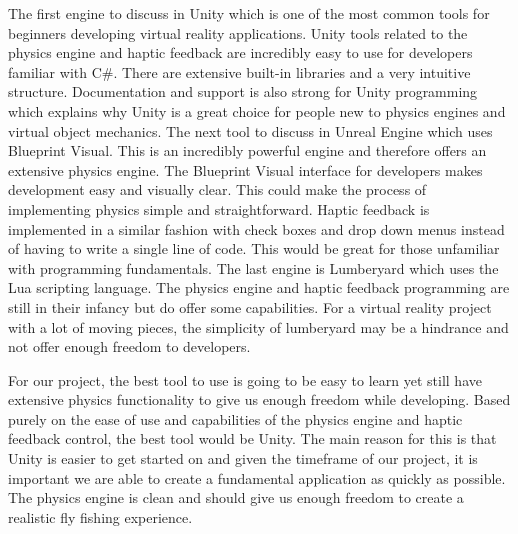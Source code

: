 \documentclass[10pt,journal,compsoc,onecolumn, draftclsnofoot]{IEEEtran}
\begin{document}
The first engine to discuss in Unity which is one of the most common tools for beginners developing virtual reality applications. Unity tools related to the physics engine and haptic feedback are incredibly easy to use for developers familiar with C\#. There are extensive built-in libraries and a very intuitive structure. Documentation and support is also strong for Unity programming which explains why Unity is a great choice for people new to physics engines and virtual object mechanics. The next tool to discuss in Unreal Engine which uses Blueprint Visual. This is an incredibly powerful engine and therefore offers an extensive physics engine. The Blueprint Visual interface for developers makes development easy and visually clear. This could make the process of implementing physics simple and straightforward. Haptic feedback is implemented in a similar fashion with check boxes and drop down menus instead of having to write a single line of code. This would be great for those unfamiliar with programming fundamentals. The last engine is Lumberyard which uses the Lua scripting language. The physics engine and haptic feedback programming are still in their infancy but do offer some capabilities. For a virtual reality project with a lot of moving pieces, the simplicity of lumberyard may be a hindrance and not offer enough freedom to developers.

For our project, the best tool to use is going to be easy to learn yet still have extensive physics functionality to give us enough freedom while developing. Based purely on the ease of use and capabilities of the physics engine and haptic feedback control, the best tool would be Unity. The main reason for this is that Unity is easier to get started on and given the timeframe of our project, it is important we are able to create a fundamental application as quickly as possible. The physics engine is clean and should give us enough freedom to create a realistic fly fishing experience.
\vspace{2mm}
\end{document}
